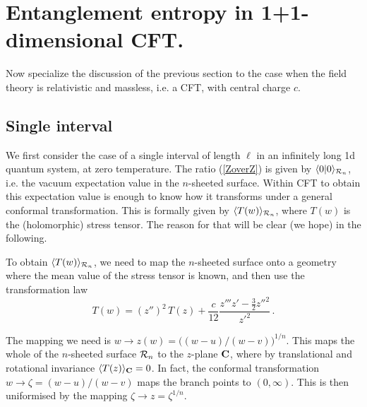 \documentclass{ws-ijqi}
\begin{document}
\section{Entanglement entropy in 1+1-dimensional CFT.}
\label{cftsec}

Now specialize the discussion of the previous section
to the case when the field theory is relativistic and massless, i.e. a
CFT, with central charge $c$.


\subsection{Single interval}

We first consider the case of a single interval of length $\ell$ in an 
infinitely long 1d quantum system, at zero temperature. 
The ratio (\ref{ZoverZ}) is given by $\langle 0|0\rangle_{{\cal R}_n}$, i.e.
the vacuum expectation value in the $n$-sheeted surface. 
Within CFT to obtain this expectation value is enough to know how 
it transforms under a general conformal transformation. 
This is formally given by $\langle T(w) \rangle_{{\cal R}_n}$, where
$T(w)$ is the (holomorphic) stress tensor.
The reason for that will be clear (we hope) in the following.  

To obtain $\langle T(w) \rangle_{{\cal R}_n}$, we need to map the 
$n$-sheeted surface onto a geometry where the mean value of the 
stress tensor is known, and then use the transformation law\cite{confbook} 
\begin{equation}
\label{schwartz}
T(w)=(z'')^2\,T(z)+\frac{c}{12} \frac{z'''z'-\frac32{z''}^2}{{z'}^2}\,.
\end{equation} 

The mapping we need is $w\to z(w)=\big((w-u)/(w-v)\big)^{1/n}$.
This maps the whole of the $n$-sheeted surface ${\cal R}_n$ to the 
$z$-plane $\bf C$, where by translational and rotational invariance 
$\langle T(z)\rangle_{\bf C}=0$.
In fact, the conformal transformation $w\to\zeta=(w-u)/(w-v)$ maps the branch 
points to $(0,\infty)$. This is then uniformised by the mapping 
$\zeta\to z=\zeta^{1/n}$. 
\end{document}

